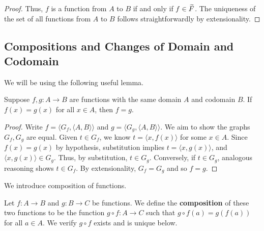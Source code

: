 \begin{proof}
	Thus, $f$ is a function from $A$ to $B$ if and only if $f\in\widetilde{F}$. 
	The uniqueness of the set of all functions from $A$ to $B$ follows straightforwardly by extensionality. 
\end{proof}

\subsection{Compositions and Changes of Domain and Codomain}

We will be using the following useful lemma.

\begin{lemma}\label{ch1thm_lemma_equality_of_fns}
	Suppose $f, g : A\rightarrow B$ are functions with the same domain $A$ and codomain $B$. 
	If $f(x) = g(x)$ for all $x\in A$, then $f = g$.
\end{lemma}
\begin{proof}
	Write $f = \langle G_{f}, \langle A, B\rangle\rangle$ and $g = \langle G_{g}, \langle A, B\rangle\rangle$. 
	We aim to show the graphs $G_{f}, G_{g}$ are equal. 
	Given $t\in G_{f}$, we know $t = \langle x, f(x)\rangle$ for some $x\in A$. 
	Since $f(x) = g(x)$ by hypothesis, substitution implies $t = \langle x, g(x)\rangle$, and $\langle x, g(x)\rangle\in G_{g}$. 
	Thus, by substitution, $t\in G_{g}$. 
	Conversely, if $t\in G_{g}$, analogous reasoning shows $t\in G_{f}$. 
	By extensionality, $G_{f} = G_{g}$ and so $f = g$. 
\end{proof}

We introduce composition of functions.

\begin{definition}[Composition]
	Let $f:A\rightarrow B$ and $g:B\rightarrow C$ be functions.
	We define the \textbf{composition} of these two functions to be the function $g\circ f:A\rightarrow C$ such that $g\circ f(a) = g(f(a))$ for all $a\in A$. 
	We verify $g\circ f$ exists and is unique below. 
\end{definition}

